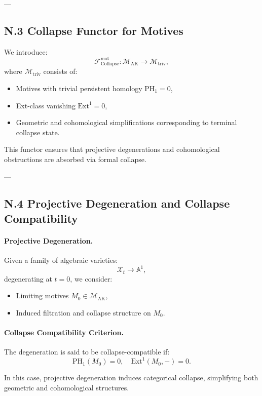 \documentclass[11pt]{article}
\begin{document}
---

\subsection*{N.3 Collapse Functor for Motives}

We introduce:
\[
\mathcal{F}_{\mathrm{Collapse}}^{\mathrm{mot}} : \mathcal{M}_{\mathrm{AK}} \longrightarrow \mathcal{M}_{\mathrm{triv}},
\]
where \( \mathcal{M}_{\mathrm{triv}} \) consists of:
\begin{itemize}
  \item Motives with trivial persistent homology \( \mathrm{PH}_1 = 0 \),
  \item Ext-class vanishing \( \mathrm{Ext}^1 = 0 \),
  \item Geometric and cohomological simplifications corresponding to terminal collapse state.
\end{itemize}

This functor ensures that projective degenerations and cohomological obstructions are absorbed via formal collapse.

---

\subsection*{N.4 Projective Degeneration and Collapse Compatibility}

\paragraph{Projective Degeneration.}
Given a family of algebraic varieties:
\[
\mathcal{X}_t \to \mathbb{A}^1,
\]
degenerating at \( t = 0 \), we consider:
\begin{itemize}
  \item Limiting motives \( M_0 \in \mathcal{M}_{\mathrm{AK}} \),
  \item Induced filtration and collapse structure on \( M_0 \).
\end{itemize}

\paragraph{Collapse Compatibility Criterion.}
The degeneration is said to be collapse-compatible if:
\[
\mathrm{PH}_1(M_0) = 0, \quad \mathrm{Ext}^1(M_0, -) = 0.
\]

In this case, projective degeneration induces categorical collapse, simplifying both geometric and cohomological structures.
\end{document}
